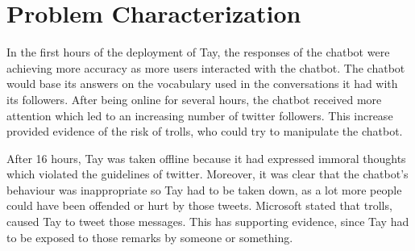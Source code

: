 \chapter{Problem Characterization}
In the first hours of the deployment of Tay, the responses of the chatbot were achieving more accuracy as more users interacted with the chatbot. The chatbot would base its answers on the vocabulary used in the conversations it had with its followers. After being online for several hours, the chatbot received more attention which led to an increasing number of twitter followers. This increase provided evidence of the risk of trolls, who could try to manipulate the chatbot.

After 16 hours, Tay was taken offline because it had expressed immoral thoughts which violated the guidelines of twitter. Moreover, it was clear that the chatbot's behaviour was inappropriate so Tay had to be taken down, as a lot more people could have been offended or hurt by those tweets. Microsoft stated that trolls\cite{definitionOfATroll}, caused Tay to tweet those messages\cite{microsoftstatement}. This has supporting evidence, since Tay had to be exposed to those remarks by someone or something.
